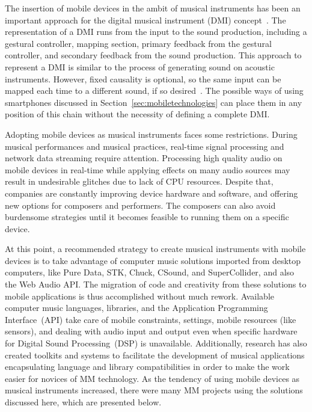 The insertion of mobile devices in the ambit of musical instruments has been an important approach for the digital musical instrument (DMI) concept~\citep{Miranda2006newdigitalmusical}.
The representation of a DMI runs from the input to the sound production, including a gestural controller, mapping section, primary feedback from the gestural controller, and secondary feedback from the sound production.
This approach to represent a DMI is similar to the process of generating sound on acoustic instruments.
However, fixed causality is optional, so the same input can be mapped each time to a different sound, if so desired~\citep{Miranda2006newdigitalmusical}.
The possible ways of using smartphones discussed in Section~\ref{sec:mobiletechnologies} can place them in any position of this chain without the necessity of defining a complete DMI.

Adopting mobile devices as musical instruments faces some restrictions.
During musical performances and musical practices, real-time signal processing and network data streaming require attention.
Processing high quality audio on mobile devices in real-time while applying effects on many audio sources may result in undesirable glitches due to lack of CPU resources.
Despite that, companies are constantly improving device hardware and software, and offering new options for composers and performers.
The composers can also avoid burdensome strategies until it becomes feasible to running them on a specific device.

At this point, a recommended strategy to create musical instruments with mobile devices is to take advantage of computer music solutions imported from desktop computers, like Pure Data, STK, Chuck, CSound, and SuperCollider, and also the Web Audio API.
The migration of code and creativity from these solutions to mobile applications is thus accomplished without much rework.
Available computer music languages, libraries, and the Application Programming Interface~(API) take care of mobile constraints, settings, mobile resources (like sensors), and dealing with audio input and output even when specific  hardware for Digital Sound Processing~(DSP) is unavailable.
Additionally, research has also created toolkits and systems to facilitate the development of musical applications encapsulating language and library compatibilities in order to make the work easier for novices of MM technology.
As the tendency of using mobile devices as musical instruments increased, there were many MM projects using the solutions discussed here, which are presented below.

